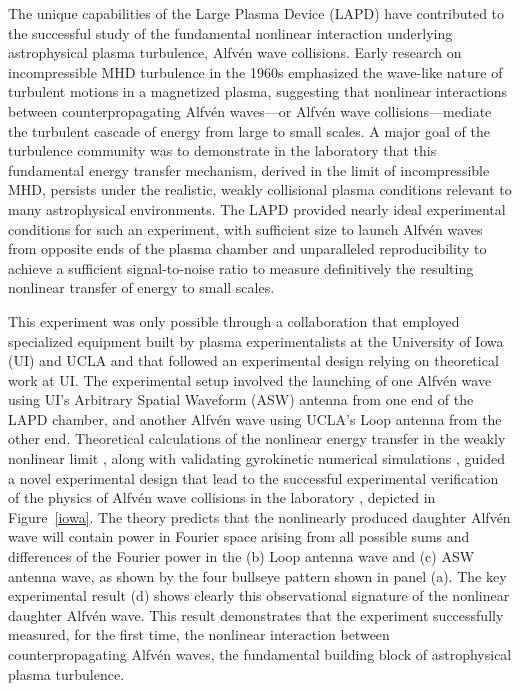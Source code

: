\documentclass[11pt]{article}
\newcommand\Alfven{Alfv\'en }
\renewcommand{\cite}{\citep}
\begin{document}
The unique capabilities of the Large Plasma Device (LAPD) have
contributed to the successful study of the fundamental nonlinear
interaction underlying astrophysical plasma turbulence, \Alfven wave
collisions.  Early research on incompressible MHD turbulence in the
1960s \cite{Iroshnikov:1963,Kraichnan:1965} emphasized the wave-like
nature of turbulent motions in a magnetized plasma, suggesting that
nonlinear interactions between counterpropagating \Alfven waves---or
\Alfven wave collisions---mediate the turbulent cascade of energy from
large to small scales. A major goal of the turbulence community was to
demonstrate in the laboratory that this fundamental energy transfer
mechanism, derived in the limit of incompressible MHD, persists under
the realistic, weakly collisional plasma conditions relevant to many
astrophysical environments. The LAPD provided nearly ideal
experimental conditions for such an experiment, with sufficient size
to launch \Alfven waves from opposite ends of the plasma chamber and
unparalleled reproducibility to achieve a sufficient signal-to-noise
ratio to measure definitively the resulting nonlinear transfer of
energy to small scales.


This experiment was only possible through a collaboration that
employed specialized equipment built by plasma experimentalists at the
University of Iowa (UI) and UCLA and that followed an experimental
design relying on theoretical work at UI.  The experimental setup
involved the launching of one \Alfven wave using UI's Arbitrary
Spatial Waveform (ASW) antenna \citep{Thuecks:2009,Kletzing:2010} from
one end of the LAPD chamber, and another \Alfven wave using UCLA's
Loop antenna \citep{auerbach:2011} from the other end. Theoretical
calculations of the nonlinear energy transfer in the weakly nonlinear
limit \cite{Howes:2013a}, along with validating gyrokinetic numerical
simulations \cite{Nielson:2013a}, guided a novel experimental design
\cite{Howes:2013b} that lead to the successful experimental
verification of the physics of \Alfven wave collisions in the
laboratory \cite{Howes:2012b,Drake:2013}, depicted in Figure~\ref{iowa}. The
theory predicts that the nonlinearly produced daughter \Alfven wave
will contain power in Fourier space arising from all possible sums and
differences of the Fourier power in the (b) Loop antenna wave and (c)
ASW antenna wave, as shown by the four bullseye pattern shown in panel
(a). The key experimental result (d) shows clearly this observational
signature of the nonlinear daughter \Alfven wave.  This result
demonstrates that the experiment successfully measured, for the first
time, the nonlinear interaction between counterpropagating \Alfven
waves, the fundamental building block of astrophysical plasma
turbulence.
\end{document}
